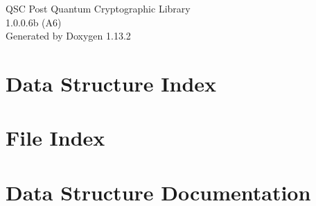 \documentclass[twoside]{book}
\newcommand{\+}{\discretionary{\mbox{\scriptsize$\hookleftarrow$}}{}{}}
\newcommand{\clearemptydoublepage}{%
    \newpage{\pagestyle{empty}\cleardoublepage}%
  }
\begin{document}
  \raggedbottom
    \hypersetup{pageanchor=false,
                bookmarksnumbered=true,
                pdfencoding=unicode
               }
  \begin{titlepage}
  \vspace*{7cm}
  \begin{center}%
  {\Large QSC Post Quantum Cryptographic Library}\\
  [1ex]\large 1.\+0.\+0.\+6b (\+A6) \\
  \vspace*{1cm}
  {\large Generated by Doxygen 1.13.2}\\
  \end{center}
  \end{titlepage}
  \clearemptydoublepage
  \tableofcontents
  \clearemptydoublepage
  \hypersetup{pageanchor=true}
\chapter{Data Structure Index}

\chapter{File Index}

\chapter{Data Structure Documentation}















































\end{document}
